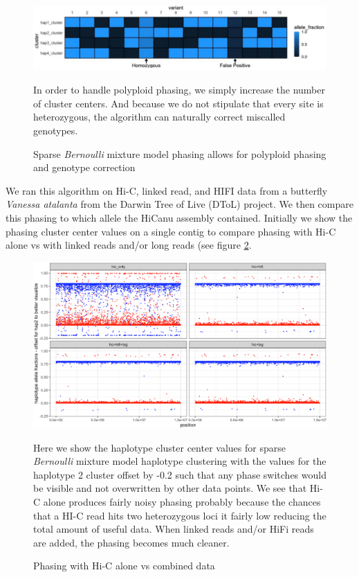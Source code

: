 \begin{figure}[htbp!]
\caption{Sparse \textit{Bernoulli} mixture model phasing allows for polyploid phasing and genotype correction}
\label{figure:bernoulli}
\begin{centering}
\includegraphics[width=\textwidth]{poly.png}
\par{In order to handle polyploid phasing, we simply increase the number of cluster centers. And because we do not stipulate that every site is heterozygous, the algorithm can naturally correct miscalled genotypes.}
\end{centering}
\end{figure}


\par{
We ran this algorithm on Hi-C, linked read, and HIFI data from a butterfly \textit{Vanessa atalanta} from the Darwin Tree of Live (DToL) project. We then compare this phasing to which allele the HiCanu assembly 
contained. Initially we show the phasing cluster center values on a single contig to compare phasing with Hi-C alone vs with linked reads and/or long reads (see figure \ref{figure:hicphasing1}.
}

\begin{figure}[htbp!]

\caption{Phasing with Hi-C alone vs combined data}
\label{figure:hicphasing1}
\begin{centering}
\includegraphics[width=\textwidth]{hicphasing1.png}
\par{Here we show the haplotype cluster center values for sparse \textit{Bernoulli} mixture model haplotype clustering with the values for the haplotype 2 cluster offset by -0.2 such that any phase switches would be visible and not overwritten by other data points. We see that Hi-C alone produces fairly noisy phasing probably because the chances that a HI-C read hits two heterozygous loci it fairly low reducing the total amount of useful data. When linked reads and/or HiFi reads are added, the phasing becomes much cleaner.}
\end{centering}
\end{figure}


